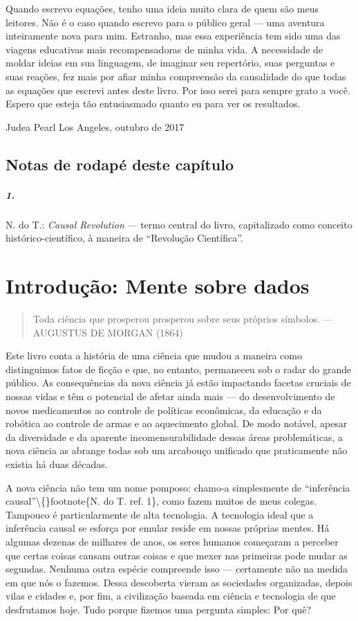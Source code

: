 \documentclass[11pt,a5paper,twoside]{book}
\begin{document}
Quando escrevo equações, tenho uma ideia muito clara de quem são meus leitores. Não é o caso quando escrevo para o público geral — uma aventura inteiramente nova para mim. Estranho, mas essa experiência tem sido uma das viagens educativas mais recompensadoras de minha vida. A necessidade de moldar ideias em sua linguagem, de imaginar seu repertório, suas perguntas e suas reações, fez mais por afiar minha compreensão da causalidade do que todas as equações que escrevi antes deste livro. Por isso serei para sempre grato a você. Espero que esteja tão entusiasmado quanto eu para ver os resultados.

Judea Pearl Los Angeles, outubro de 2017

\section*{Notas de rodapé deste capítulo}
\paragraph{1.} N. do T.: \textit{Causal Revolution} — termo central do livro, capitalizado como conceito histórico-científico, à maneira de “Revolução Científica”.
\chapter{Introdução: Mente sobre dados}
\begin{quote}
Toda ciência que prosperou prosperou sobre seus próprios símbolos.   — AUGUSTUS DE MORGAN (1864)
\end{quote}
Este livro conta a história de uma ciência que mudou a maneira como distinguimos fatos de ficção e que, no entanto, permaneceu sob o radar do grande público. As consequências da nova ciência já estão impactando facetas cruciais de nossas vidas e têm o potencial de afetar ainda mais — do desenvolvimento de novos medicamentos ao controle de políticas econômicas, da educação e da robótica ao controle de armas e ao aquecimento global. De modo notável, apesar da diversidade e da aparente incomensurabilidade dessas áreas problemáticas, a nova ciência as abrange todas sob um arcabouço unificado que praticamente não existia há duas décadas.

A nova ciência não tem um nome pomposo: chamo-a simplesmente de “inferência causal”\textbackslash\{\}footnote\{N. do T. ref. 1\}, como fazem muitos de meus colegas. Tampouco é particularmente de alta tecnologia. A tecnologia ideal que a inferência causal se esforça por emular reside em nossas próprias mentes. Há algumas dezenas de milhares de anos, os seres humanos começaram a perceber que certas coisas causam outras coisas e que mexer nas primeiras pode mudar as segundas. Nenhuma outra espécie compreende isso — certamente não na medida em que nós o fazemos. Dessa descoberta vieram as sociedades organizadas, depois vilas e cidades e, por fim, a civilização baseada em ciência e tecnologia de que desfrutamos hoje. Tudo porque fizemos uma pergunta simples: Por quê?
\end{document}
